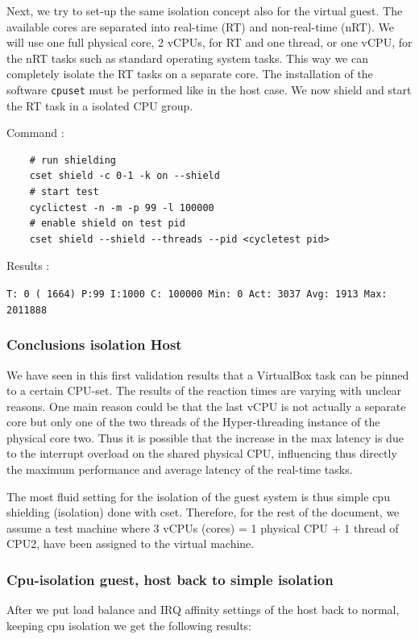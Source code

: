 \documentclass[]{scrartcl}
\begin{document}
Next, we try to set-up the same isolation concept also for the virtual guest. The available cores are separated into real-time (RT) and non-real-time (nRT). We will use one full physical core, 2 vCPUs, for RT and one thread, or one vCPU, for the nRT tasks such as standard operating system tasks. This way we can completely isolate the RT tasks on a separate core. The installation of the software \texttt{cpuset} must be performed like in the host case. We now shield and start the RT task in a isolated CPU group.

\noindent Command : 

\begin{verbatim}
	# run shielding
	cset shield -c 0-1 -k on --shield
	# start test
	cyclictest -n -m -p 99 -l 100000
	# enable shield on test pid
	cset shield --shield --threads --pid <cycletest pid>
\end{verbatim}

\noindent Results :

\noindent \texttt{T: 0 ( 1664) P:99 I:1000 C: 100000 Min:      0 Act: 3037 Avg: 1913 Max:  2011888}

\subsubsection{Conclusions isolation Host}

We have seen in this first validation results that a VirtualBox task can be pinned to a certain CPU-set. The results of the reaction times are varying with unclear reasons. One main reason could be that the last vCPU is not actually a separate core but only one of the two threads of the Hyper-threading instance of the physical core two. Thus it is possible that the increase in the max latency is due to the interrupt overload on the shared physical CPU, influencing thus directly the maximum performance and average latency of the real-time tasks.

The most fluid setting for the isolation of the guest system is thus simple cpu shielding (isolation) done with cset. Therefore, for the rest of the document, we assume a test machine where 3 vCPUs (cores) = 1 physical CPU + 1 thread of CPU2, have been assigned to the virtual machine.

\subsubsection{Cpu-isolation guest, host back to simple isolation}

After we put load balance and IRQ affinity settings of the host back to normal, keeping cpu isolation we get the following results:
\end{document}

